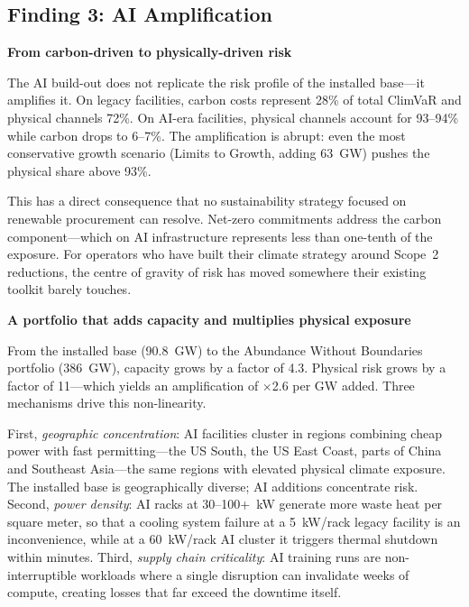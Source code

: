 \clearpage\thispagestyle{chapterstart}

\subsection*{Finding 3: AI Amplification}\label{toc:f3}
\greensep

\begin{twocolbody}

{\color{SEGreen}\textbf{From carbon-driven to physically-driven risk}}

\vspace{1mm}

\noindent The AI build-out does not replicate the risk profile of the installed base---it amplifies it. On legacy facilities, carbon costs represent 28\% of total ClimVaR and physical channels 72\%. On AI-era facilities, physical channels account for 93--94\% while carbon drops to 6--7\%. The amplification is abrupt: even the most conservative growth scenario (Limits to Growth, adding 63~GW) pushes the physical share above 93\%. 

This has a direct consequence that no sustainability strategy focused on renewable procurement can resolve. Net-zero commitments address the carbon component---which on AI infrastructure represents less than one-tenth of the exposure. For operators who have built their climate strategy around Scope~2 reductions, the centre of gravity of risk has moved somewhere their existing toolkit barely touches.

\vspace{5mm}

{\color{SEGreen}\textbf{A portfolio that adds capacity and multiplies physical exposure}}

\vspace{1mm}

\noindent From the installed base (90.8~GW) to the Abundance Without Boundaries portfolio (386~GW), capacity grows by a factor of 4.3. Physical risk grows by a factor of 11---which yields an amplification of $\times$2.6 per GW added. Three mechanisms drive this non-linearity.

First, \textit{geographic concentration}: AI facilities cluster in regions combining cheap power with fast permitting---the US South, the US East Coast, parts of China and Southeast Asia---the same regions with elevated physical climate exposure. The installed base is geographically diverse; AI additions concentrate risk. Second, \textit{power density}: AI racks at 30--100+~kW generate more waste heat per square meter, so that a cooling system failure at a 5~kW/rack legacy facility is an inconvenience, while at a 60~kW/rack AI cluster it triggers thermal shutdown within minutes. Third, \textit{supply chain criticality}: AI training runs are non-interruptible workloads where a single disruption can invalidate weeks of compute, creating losses that far exceed the downtime itself.


\end{twocolbody}
